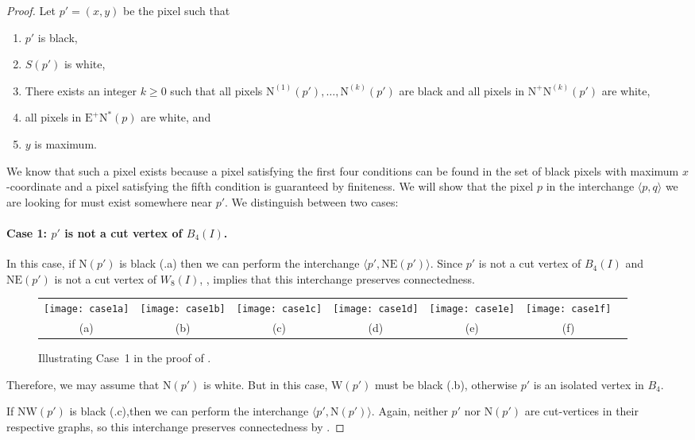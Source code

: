 \documentclass[lotsofwhite,charterfonts]{patmorin}
\newcommand{\N}{\mathrm{N}}
\newcommand{\NE}{\mathrm{NE}}
\newcommand{\E}{\mathrm{E}}
\newcommand{\W}{\mathrm{W}}
\newcommand{\NW}{\mathrm{NW}}
\newcommand{\ic}[2]{\langle #1,#2 \rangle}
\begin{document}
\begin{proof}
Let $p'=(x,y)$ be the pixel such that
\begin{enumerate}
  \item $p'$ is black, 
  \item $S(p')$ is white,
  \item There exists an integer $k\ge 0$ such that all pixels
	$\N^{(1)}(p'),\ldots,\N^{(k)}(p')$ are black and 
        all pixels in $\N^{+}\N^{(k)}(p')$ are white,
  \item all pixels in $\E^+\N^*(p)$ are white, and
  \item $y$ is maximum.
\end{enumerate}
We know that such a pixel exists because a pixel satisfying the first
four conditions can be found in the set of black pixels with maximum
$x$-coordinate and a pixel satisfying the fifth condition is
guaranteed by finiteness.  We will show that the pixel $p$ in the
interchange $\ic{p}{q}$ we are looking for must exist somewhere near
$p'$.  We distinguish between two cases:

\paragraph{Case 1: $p'$ is not a cut vertex of $B_4(I)$.}  In this
case, if $\N(p')$ is black (.a) then we can perform
the interchange $\ic{p'}{\NE(p')}$.  Since $p'$ is not a cut vertex of
$B_4(I)$ and $\NE(p')$ is not a cut vertex of $W_8(I)$,
, implies that this interchange preserves
connectedness.

\begin{figure}
\begin{center}
\begin{tabular}{ccccccc}
\texttt{[image: case1a]} & 
\texttt{[image: case1b]} & 
\texttt{[image: case1c]} & 
\texttt{[image: case1d]} & 
\texttt{[image: case1e]} & 
\texttt{[image: case1f]} \\
(a) & (b) & (c) & (d) & (e) & (f)
\end{tabular}
\end{center}
\caption{Illustrating Case~1 in the proof of .}
\end{figure}

Therefore, we may assume that $\N(p')$ is white.  But in this case,
$\W(p')$ must be black (.b), otherwise $p'$ is an
isolated vertex in $B_4$.

If $\NW(p')$ is black (.c),then we can perform the
interchange $\ic{p'}{\N(p')}$.  Again, neither $p'$ nor $\N(p')$ are
cut-vertices in their respective graphs, so this interchange preserves
connectedness by .


\end{proof}
\end{document}

